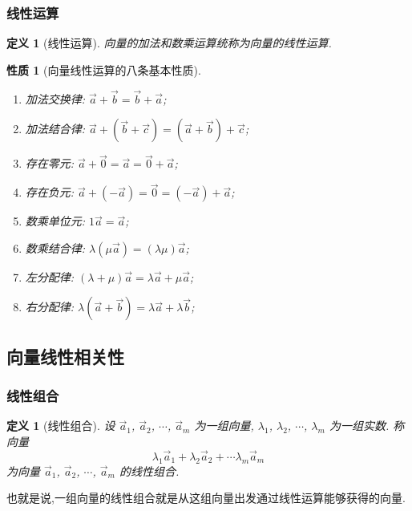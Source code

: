 \documentclass{article}
\newtheorem{proposition}[theorem]{性质}  %
\newtheorem{definition}[theorem]{定义}
\renewcommand{\blue }[1]{{\textcolor[rgb]{0,0,1}{#1}}}
\begin{document}
\subsubsection{线性运算}
\begin{definition}[线性运算]
向量的\blue{加法}和\blue{数乘}运算统称为向量的\blue{线性运算}.
\end{definition}
\begin{proposition}[向量线性运算的八条基本性质]
\begin{enumerate}
\item 加法交换律: $\vec{a}+\vec{b}=\vec{b}+\vec{a}$;
\item 加法结合律: $\vec{a}+(\vec{b}+\vec{c})=(\vec{a}+\vec{b})+\vec{c}$;
\item 存在零元: $\vec{a}+\vec{0}=\vec{a}=\vec{0}+\vec{a}$;
\item 存在负元: $\vec{a}+(-\vec{a})=\vec{0}=(-\vec{a})+\vec{a}$;
\item 数乘单位元: $1\vec{a} = \vec{a}$;
\item 数乘结合律: $\lambda(\mu \vec{a})=(\lambda \mu)\vec{a}$;
\item 左分配律: $(\lambda+\mu)\vec{a}=\lambda \vec{a} + \mu \vec{a}$;
\item 右分配律: $\lambda (\vec{a}+\vec{b}) =\lambda \vec{a} + \lambda \vec{b}$;
\end{enumerate}
\end{proposition}


\subsection{向量线性相关性}

\subsubsection{线性组合}
\begin{definition}[线性组合]
设 $\vec{a}_1$, $\vec{a}_2$, $\cdots$, $\vec{a}_m$  为一组向量, $\lambda_1$, $\lambda_2$, $\cdots$, $\lambda_m$ 为一组实数. 称向量
\[\lambda_1\vec{a}_1 + \lambda_2\vec{a}_2 + \cdots \lambda_m\vec{a}_m\]
为向量 $\vec{a}_1$, $\vec{a}_2$, $\cdots$, $\vec{a}_m$ 的\blue{线性组合}.
\end{definition}
也就是说,一组向量的线性组合就是从这组向量出发通过线性运算能够获得的向量.
\end{document}
